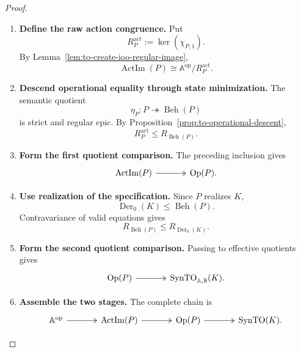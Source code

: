 \begin{proof}
    \leavevmode
    \begin{enumerate}
        \item \textbf{Define the raw action congruence.}
        Put
        \[
            R_P^{\mathrm{act}}
            :=
            \ker(\chi_{P,1}).
        \]
        By Lemma~\ref{lem:to-create-ioo-regular-image},
        \[
            \operatorname{ActIm}(P)
            \cong
            \mathbb A^{\mathrm{op}}/R_P^{\mathrm{act}}.
        \]

        \item \textbf{Descend operational equality through state minimization.}
        The semantic quotient
        \[
            \eta_P:
            P\twoheadrightarrow\operatorname{Beh}(P)
        \]
        is strict and regular epic. By
        Proposition~\ref{prop:to-operational-descent},
        \[
            R_P^{\mathrm{act}}
            \leq
            R_{\operatorname{Beh}(P)}.
        \]

        \item \textbf{Form the first quotient comparison.}
        The preceding inclusion gives
        \[
        \begin{tikzcd}[column sep=large]
            \operatorname{ActIm}(P)
                \arrow[r, two heads]
            &
            \operatorname{Op}(P).
        \end{tikzcd}
        \]

        \item \textbf{Use realization of the specification.}
        Since \(P\) realizes \(K\),
        \[
            \operatorname{Der}_0(K)
            \leq
            \operatorname{Beh}(P).
        \]
        Contravariance of valid equations gives
        \[
            R_{\operatorname{Beh}(P)}
            \leq
            R_{\operatorname{Der}_0(K)}.
        \]

        \item \textbf{Form the second quotient comparison.}
        Passing to effective quotients gives
        \[
        \begin{tikzcd}[column sep=large]
            \operatorname{Op}(P)
                \arrow[r, two heads]
            &
            \operatorname{SynTO}_{\mathbb A,\mathbb B}(K).
        \end{tikzcd}
        \]

        \item \textbf{Assemble the two stages.}
        The complete chain is
        \[
        \begin{tikzcd}[column sep=large]
            \mathbb A^{\mathrm{op}}
                \arrow[r, two heads]
            &
            \operatorname{ActIm}(P)
                \arrow[r, two heads]
            &
            \operatorname{Op}(P)
                \arrow[r, two heads]
            &
            \operatorname{SynTO}(K).
        \end{tikzcd}
        \]
    \end{enumerate}
\end{proof}


